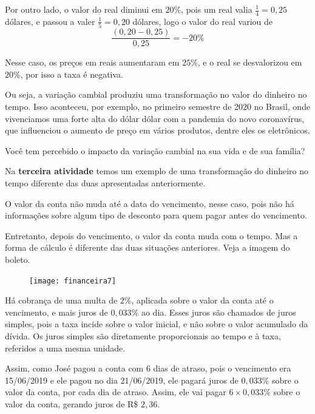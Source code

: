 Por outro lado, o valor do real diminui em $20$\%, pois um real valia $\frac{1}{4}=0{,}25$ dólares, e passou a valer $\frac{1}{5}=0{,}20$ dólares, logo o valor do real variou de 
\begin{equation*}
\frac{(0{,}20-0{,}25)}{0{,}25}=-20\%
\end{equation*}

Nesse caso, os preços em reais aumentaram em $25$\%, e o real se desvalorizou em $20$\%, por isso a taxa é negativa.

Ou seja, a variação cambial produziu uma transformação no valor do dinheiro no tempo. Isso aconteceu, por exemplo, no primeiro semestre de 2020 no Brasil, onde vivenciamos uma forte alta do dólar dólar com a pandemia do novo coronavírus, que influenciou o aumento de preço em vários produtos, dentre eles os eletrônicos.

\begin{observation}{}
{Você tem percebido o impacto da variação cambial na sua vida e de sua família?}
\end{observation}

Na \textbf{terceira atividade} temos um exemplo de uma transformação do dinheiro no tempo diferente das duas apresentadas anteriormente.

O valor da conta não muda até a data do vencimento, nesse caso, pois não há informações sobre algum tipo de desconto para quem pagar antes do vencimento.

Entretanto, depois do vencimento, o valor da conta muda com o tempo. Mas a forma de cálculo é diferente das duas situações anteriores. Veja a imagem do boleto.

\begin{figure}[H]
\centering

\texttt{[image: financeira7]}
\end{figure}

Há cobrança de uma multa de $2$\%, aplicada sobre o valor da conta até o vencimento, e mais juros de $0{,}033$\% ao dia. Esses juros são chamados de juros simples, pois a taxa incide sobre o valor inicial, e não sobre o valor acumulado da dívida. Os juros simples são diretamente proporcionais ao tempo e à taxa, referidos a uma mesma unidade.

Assim, como José pagou a conta com 6 dias de atraso, pois o vencimento era 15/06/2019 e ele pagou no dia 21/06/2019, ele pagará juros de $0{,}033$\% sobre o valor da conta, por cada dia de atraso. Assim, ele vai pagar $6\times0{,}033$\% sobre o valor da conta, gerando juros de R\$ $2{,}36$.

